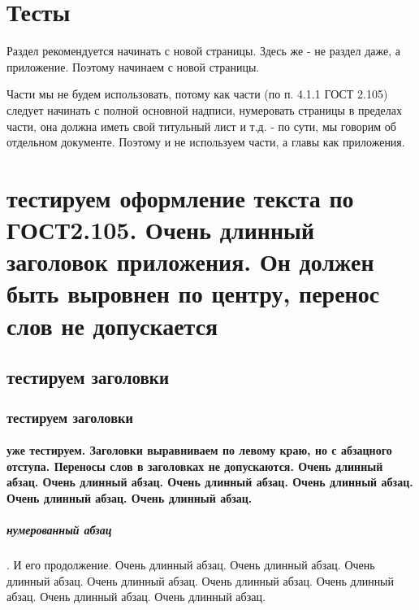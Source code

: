 
\let\le\leqslant
\let\ge\geqslant
\let\tan\tg
\let\arctan\arctg
\let\cot\ctg
\let\arccot\arcctg
\let\times\cdot

\makeatletter

	\appendix
	\chapter{Тесты}
	
	Раздел рекомендуется начинать с новой страницы. Здесь же - не раздел даже, а приложение.
	Поэтому начинаем с новой страницы.
	
	Части мы не будем использовать, потому как части (по п. 4.1.1 ГОСТ 2.105) следует
	начинать с полной основной надписи, нумеровать страницы в пределах части,
	она должна иметь свой титульный лист и т.д. - по сути, мы говорим об отдельном документе.
	Поэтому и не используем части, а главы как приложения.

	\chapter{тестируем оформление текста по ГОСТ2.105. Очень длинный заголовок приложения.
		Он должен быть выровнен по центру, перенос слов не допускается}
	\section{тестируем заголовки}
	\subsection{тестируем заголовки}
	\subsubsection{уже тестируем.
		Заголовки выравниваем по левому краю, но с абзацного отступа.
		Переносы слов в заголовках не допускаются.
		Очень длинный абзац. Очень длинный абзац.
		Очень длинный абзац. Очень длинный абзац. Очень длинный абзац. Очень длинный абзац.}
	
	\paragraph{нумерованный абзац}. И его продолжение.
	Очень длинный абзац. Очень длинный абзац. Очень длинный абзац. Очень длинный абзац.
	Очень длинный абзац. Очень длинный абзац. Очень длинный абзац. Очень длинный абзац.
		
